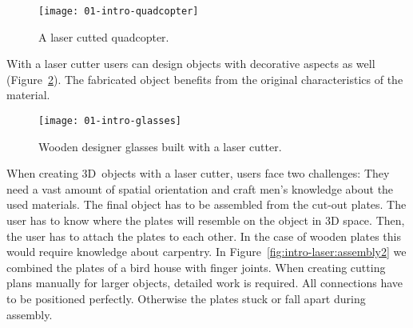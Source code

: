\documentclass[../ClassicThesis.tex]{subfiles}
\begin{document}
\begin{figure}
  \texttt{[image: 01-intro-quadcopter]}
  \caption{A laser cutted quadcopter.}
  \label{fig:intro-quadcopter}
\end{figure}

With a laser cutter users can design objects with decorative
aspects as well (Figure~\ref{fig:intro-glasses}).
The fabricated object benefits from the original
characteristics of the material.

\begin{figure}
  \texttt{[image: 01-intro-glasses]}
  \caption{Wooden designer glasses built with a laser cutter.}
  \label{fig:intro-glasses}
\end{figure}


When creating 3D~objects with a laser cutter, users face two
challenges: They need a vast amount of spatial orientation
and craft men's knowledge about the used materials. The
final object has to be assembled from the cut-out plates.
The user has to know where the plates will resemble on the
object in 3D space. Then, the user has to attach the plates
to each other. In the case of wooden plates this would
require knowledge about carpentry. In
Figure~\ref{fig:intro-laser:assembly2} we combined the
plates of a bird house with finger joints. When creating
cutting plans manually for larger objects, detailed work is
required. All connections have to be positioned perfectly.
Otherwise the plates stuck or fall apart during assembly.

\end{document}

